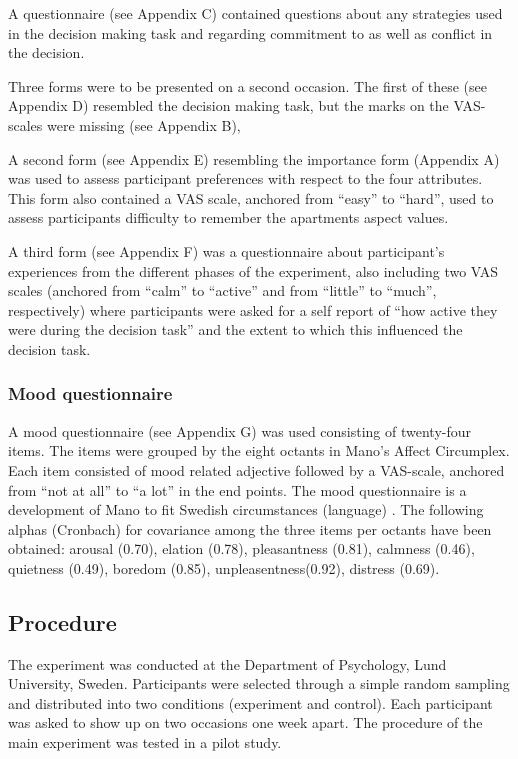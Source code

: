 \documentclass[jou,draftfirst,11pt]{apa6}
\begin{document}
A questionnaire (see Appendix C) contained questions about any
strategies used in the decision making task and regarding commitment
to as well as conflict in the decision.

Three forms were to be presented on a second occasion.  The first of
these (see Appendix D) resembled the decision making task, but the
marks on the VAS-scales were missing (see Appendix B),

A second form (see Appendix E) resembling the importance form
(Appendix A) was used to assess participant preferences with respect
to the four attributes.  This form also contained a VAS scale,
anchored from ``easy'' to ``hard'', used to assess participants difficulty
to remember the apartments aspect values.

A third form (see Appendix F) was a questionnaire about participant's
experiences from the different phases of the experiment, also
including two VAS scales (anchored from ``calm'' to ``active'' and from
``little'' to ``much'', respectively) where participants were asked for a
self report of ``how active they were during the decision task'' and the
extent to which this influenced the decision task.


\subsubsection{Mood questionnaire} 
A mood questionnaire (see Appendix G) was used
consisting of twenty-four items.  The items were grouped by the eight
octants in Mano's Affect Circumplex.  Each item consisted of mood
related adjective followed by a VAS-scale, anchored from ``not at all''
to ``a lot'' in the end points.  The mood questionnaire is a development
of Mano \parencite{LewinsohnMano93} to fit Swedish circumstances
(language) \parencite{Salo96}.  The following alphas (Cronbach) for
covariance among the three items per octants have been obtained:
arousal (0.70), elation (0.78), pleasantness (0.81), calmness (0.46),
quietness (0.49), boredom (0.85), unpleasentness(0.92), distress
(0.69).


\subsection{Procedure}

The experiment was conducted at the Department of Psychology, Lund
University, Sweden.  Participants were selected through a simple
random sampling and distributed into two conditions (experiment and
control).  Each participant was asked to show up on two occasions one
week apart.  The procedure of the main experiment was tested in a
pilot study.
\end{document}
